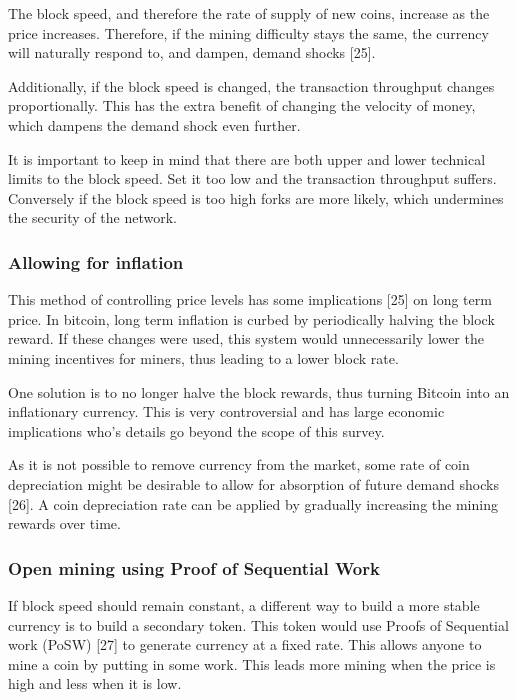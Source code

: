 \documentclass[english,]{IEEEtran}
\begin{document}
The block speed, and therefore the rate of supply of new coins, increase
as the price increases. Therefore, if the mining difficulty stays the
same, the currency will naturally respond to, and dampen, demand shocks
{[}25{]}.

Additionally, if the block speed is changed, the transaction throughput
changes proportionally. This has the extra benefit of changing the
velocity of money, which dampens the demand shock even further.

It is important to keep in mind that there are both upper and lower
technical limits to the block speed. Set it too low and the transaction
throughput suffers. Conversely if the block speed is too high forks are
more likely, which undermines the security of the network.

\subsubsection{Allowing for inflation}\label{allowing-for-inflation}

This method of controlling price levels has some implications {[}25{]}
on long term price. In bitcoin, long term inflation is curbed by
periodically halving the block reward. If these changes were used, this
system would unnecessarily lower the mining incentives for miners, thus
leading to a lower block rate.

One solution is to no longer halve the block rewards, thus turning
Bitcoin into an inflationary currency. This is very controversial and
has large economic implications who's details go beyond the scope of
this survey.

As it is not possible to remove currency from the market, some rate of
coin depreciation might be desirable to allow for absorption of future
demand shocks {[}26{]}. A coin depreciation rate can be applied by
gradually increasing the mining rewards over time.

\subsubsection{Open mining using Proof of Sequential
Work}\label{open-mining-using-proof-of-sequential-work}

If block speed should remain constant, a different way to build a more
stable currency is to build a secondary token. This token would use
Proofs of Sequential work (PoSW) {[}27{]} to generate currency at a
fixed rate. This allows anyone to mine a coin by putting in some work.
This leads more mining when the price is high and less when it is low.
\end{document}
